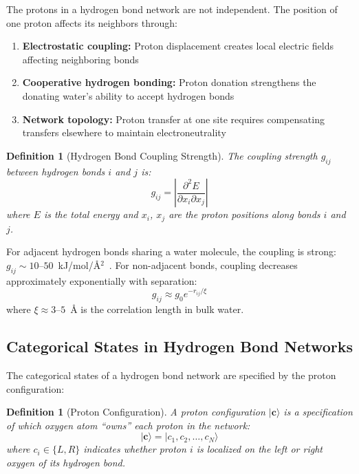 \documentclass[twocolumn,showpacs,preprintnumbers,amsmath,amssymb,prd]{revtex4-2}
\newtheorem{definition}[theorem]{Definition}
\begin{document}
The protons in a hydrogen bond network are not independent. The position of one proton affects its neighbors through:
\begin{enumerate}
\item \textbf{Electrostatic coupling:} Proton displacement creates local electric fields affecting neighboring bonds
\item \textbf{Cooperative hydrogen bonding:} Proton donation strengthens the donating water's ability to accept hydrogen bonds
\item \textbf{Network topology:} Proton transfer at one site requires compensating transfers elsewhere to maintain electroneutrality
\end{enumerate}

\begin{definition}[Hydrogen Bond Coupling Strength]
\label{def:hbond_coupling}
The coupling strength $g_{ij}$ between hydrogen bonds $i$ and $j$ is:
\begin{equation}
g_{ij} = \left|\frac{\partial^2 E}{\partial x_i \partial x_j}\right|
\label{eq:hbond_coupling}
\end{equation}
where $E$ is the total energy and $x_i$, $x_j$ are the proton positions along bonds $i$ and $j$.
\end{definition}

For adjacent hydrogen bonds sharing a water molecule, the coupling is strong: $g_{ij} \sim 10$--$50$~kJ/mol/\AA$^2$~\cite{Marx2006}. For non-adjacent bonds, coupling decreases approximately exponentially with separation:
\begin{equation}
g_{ij} \approx g_0 e^{-r_{ij}/\xi}
\label{eq:coupling_decay}
\end{equation}
where $\xi \approx 3$--$5$~\AA{} is the correlation length in bulk water.

\subsection{Categorical States in Hydrogen Bond Networks}

The categorical states of a hydrogen bond network are specified by the proton configuration:

\begin{definition}[Proton Configuration]
\label{def:proton_config}
A proton configuration $|\mathbf{c}\rangle$ is a specification of which oxygen atom ``owns'' each proton in the network:
\begin{equation}
|\mathbf{c}\rangle = |c_1, c_2, \ldots, c_N\rangle
\label{eq:proton_config}
\end{equation}
where $c_i \in \{L, R\}$ indicates whether proton $i$ is localized on the left or right oxygen of its hydrogen bond.
\end{definition}
\end{document}
